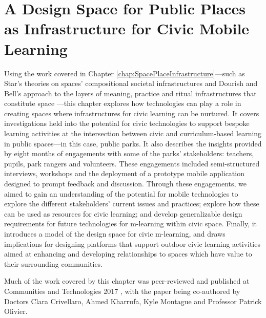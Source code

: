 \chapter{A Design Space for Public Places as Infrastructure for Civic Mobile Learning}
\label{chap:DesignSpace}

Using the work covered in Chapter \ref{chap:SpacePlaceInfrastructure}---such as Star’s theories on spaces’ compositional societal infrastructures \citep{Star1999} and Dourish and Bell’s approach to the layers of meaning, practice and ritual infrastructures that constitute space \citep{Dourish2006}---this chapter explores how technologies can play a role in creating spaces where infrastructures for civic learning can be nurtured. It covers investigations held into the potential for civic technologies to support bespoke learning activities at the intersection between civic and curriculum-based learning in public spaces---in this case, public parks. It also describes the insights provided by eight months of engagements with some of the parks' stakeholders: teachers, pupils, park rangers and volunteers. These engagements included semi-structured interviews, workshops and the deployment of a prototype mobile application designed to prompt feedback and discussion. Through these engagements, we aimed to gain an understanding of the potential for mobile technologies to explore the different stakeholders' current issues and practices; explore how these can be used as resources for civic learning; and develop generalizable design requirements for future technologies for m-learning within civic space. Finally, it introduces a model of the design space for civic m-learning, and draws implications for designing platforms that support outdoor civic learning activities aimed at enhancing and developing relationships to spaces which have value to their surrounding communities. 

Much of the work covered by this chapter was peer-reviewed and published at Communities and Technologies 2017 \citep{Richardson2017}, with the paper being co-authored by Doctors Clara Crivellaro, Ahmed Kharrufa, Kyle Montague and Professor Patrick Olivier. 

